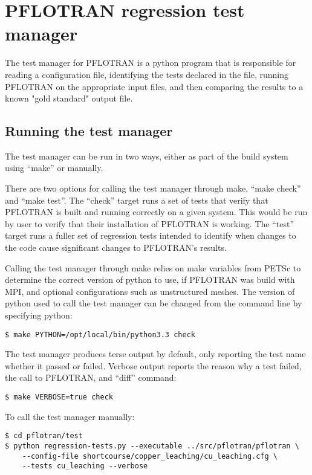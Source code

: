 \section{PFLOTRAN regression test manager}

The test manager for PFLOTRAN is a python program that is responsible
for reading a configuration file, identifying the tests declared in
the file, running PFLOTRAN on the appropriate input files, and then
comparing the results to a known "gold standard" output file.

\subsection{Running the test manager}
The test manager can be run in two ways, either as part of the build
system using ``make'' or manually.

There are two options for calling the test manager through make,
``make check'' and ``make test''. The ``check'' target runs a set of
tests that verify that PFLOTRAN is built and running correctly on a
given system. This would be run by user to verify that their
installation of PFLOTRAN is working. The ``test'' target runs a fuller
set of regression tests intended to identify when changes to the code
cause significant changes to PFLOTRAN's results.

Calling the test manager through make relies on make variables from
PETSc to determine the correct version of python to use, if PFLOTRAN
was build with MPI, and optional configurations such as unstructured
meshes. The version of python used to call the test manager can be
changed from the command line by specifying python:

\begin{verbatim}
$ make PYTHON=/opt/local/bin/python3.3 check
\end{verbatim}

The test manager produces terse output by default, only reporting the
test name whether it passed or failed. Verbose output reports the
reason why a test failed, the call to PFLOTRAN, and ``diff'' command:

\begin{verbatim}
$ make VERBOSE=true check
\end{verbatim}

To call the test manager manually:
\begin{verbatim}
$ cd pflotran/test
$ python regression-tests.py --executable ../src/pflotran/pflotran \
    --config-file shortcourse/copper_leaching/cu_leaching.cfg \
    --tests cu_leaching --verbose
\end{verbatim}

